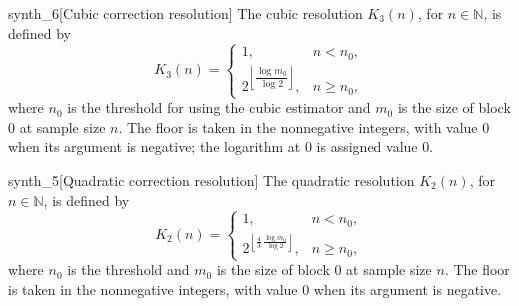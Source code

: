 \documentclass[11pt]{article}
\begin{document}
\begin{definitionv}{synth_6}[Cubic correction resolution]
The cubic resolution \(K_3(n)\), for \(n\in\mathbb N\), is defined by
\[
K_3(n)=
\begin{cases}
1, & n<n_0,\\[2pt]
2^{\left\lfloor \dfrac{\log m_0}{\log 2}\right\rfloor}, & n\ge n_0,
\end{cases}
\]
where \(n_0\) is the threshold for using the cubic estimator and \(m_0\) is the size of block \(0\) at sample size \(n\). The floor is taken in the nonnegative integers, with value \(0\) when its argument is negative; the logarithm at \(0\) is assigned value \(0\).
\end{definitionv}

\begin{definitionv}{synth_5}[Quadratic correction resolution]
The quadratic resolution \(K_2(n)\), for \(n\in\mathbb N\), is defined by
\[
K_2(n)=
\begin{cases}
1, & n<n_0,\\[2pt]
2^{\left\lfloor \frac{4}{3}\,\frac{\log m_0}{\log 2}\right\rfloor},
& n\ge n_0,
\end{cases}
\]
where \(n_0\) is the threshold and \(m_0\) is the size of block \(0\) at sample size \(n\). The floor is taken in the nonnegative integers, with value \(0\) when its argument is negative.
\end{definitionv}
\end{document}
